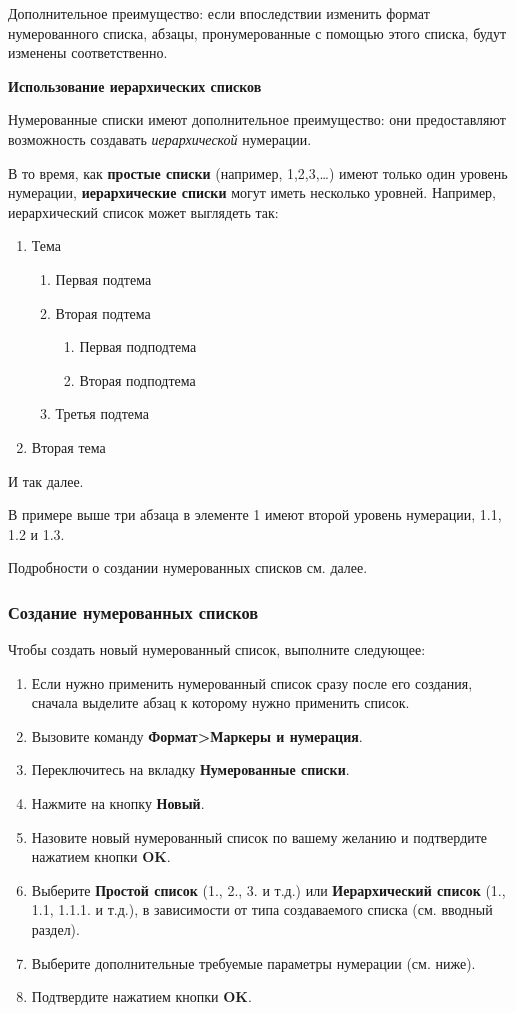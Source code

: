 ﻿\documentclass[a4paper,10pt]{article}
\begin{document}
Дополнительное преимущество: если впоследствии изменить формат нумерованного списка, абзацы, пронумерованные с помощью этого списка, будут изменены соответственно.

\textbf{Использование иерархических списков}

Нумерованные списки имеют дополнительное преимущество: они предоставляют возможность создавать \textit{иерархической} нумерации.

В то время, как \textbf{простые списки} (например, 1,2,3,…) имеют только один уровень нумерации, \textbf{иерархические списки} могут иметь несколько уровней. Например, иерархический список может выглядеть так:

\begin{enumerate}
  \item Тема
  \begin{enumerate}[label*=\arabic*.]
    \item Первая подтема
    \item Вторая подтема
    \begin{enumerate}[label*=\arabic*.]
      \item Первая подподтема
      \item Вторая подподтема
    \end{enumerate}
    \item Третья подтема
  \end{enumerate}
  \item Вторая тема
\end{enumerate}

И так далее.

В примере выше три абзаца в элементе 1 имеют второй уровень нумерации, 1.1, 1.2 и 1.3.

Подробности о создании нумерованных списков см. далее.

\subsubsection{Создание нумерованных списков}
Чтобы создать новый нумерованный список, выполните следующее:
\begin{enumerate}
 \item Если нужно применить нумерованный список сразу после его создания, сначала выделите абзац к которому нужно применить список.
 \item Вызовите команду \textbf{Формат>Маркеры и нумерация}.
 \item Переключитесь на вкладку \textbf{Нумерованные списки}.
 \item Нажмите на кнопку \textbf{Новый}.
 \item Назовите новый нумерованный список по вашему желанию и подтвердите нажатием кнопки \textbf{OK}.
 \item Выберите \textbf{Простой список} (1., 2., 3. и т.д.) или \textbf{Иерархический список} (1., 1.1, 1.1.1. и т.д.), в зависимости от типа создаваемого списка (см. вводный раздел).
 \item Выберите дополнительные требуемые параметры нумерации (см. ниже).
 \item Подтвердите нажатием кнопки \textbf{OK}.
\end{enumerate}
\end{document}
